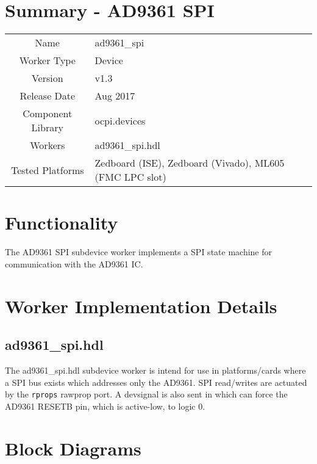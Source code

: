 \documentclass{article}
\author{} %
\date{Version \docVersion} %
\title{\docTitle}
\def\docVersion{1.3}
\def\devsignal{devsignal}
\def\comp{ad9361\_spi}
\def\Comp{AD9361 SPI}
\begin{document}
\section*{Summary - \Comp}
\begin{tabular}{|c|M{13.5cm}|}
	\hline
	                  &                  \\
	\hline
	Name              & \comp            \\
	\hline
	Worker Type       & Device           \\
	\hline
	Version           & v\docVersion{}   \\
	\hline
	Release Date      & Aug 2017         \\
	\hline
	Component Library & ocpi.devices     \\
	\hline
	Workers           & \comp.hdl        \\
	\hline
	Tested Platforms  & Zedboard (ISE), Zedboard (Vivado), ML605 (FMC LPC slot) \\
	\hline
\end{tabular}
\section*{Functionality}
	The \Comp{} subdevice worker implements a SPI state machine for communication with the AD9361 IC\cite{ad9361}.
\section*{Worker Implementation Details}
\subsection*{\comp.hdl}
The \comp{}.hdl subdevice worker is intend for use in platforms/cards where a SPI bus exists which addresses only the AD9361. SPI read/writes are actuated by the \verb+rprops+ rawprop port. A \devsignal{} is also sent in which can force the AD9361 RESETB pin, which is active-low, to logic 0.
\section*{Block Diagrams}
\end{document}
